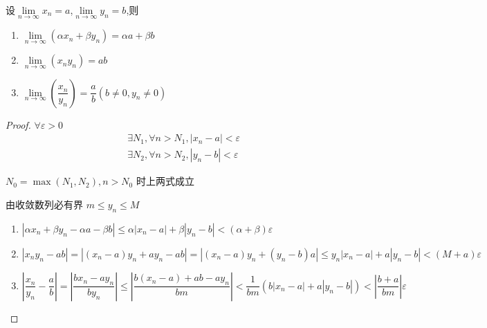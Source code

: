 \begin{theorem}
	设$\lim\limits_{n \rightarrow \infty}x_n=a$,$\lim\limits_{n \rightarrow \infty}y_n=b$,则
	\begin{enumerate}
		\item$\lim\limits_{n \rightarrow \infty}\left(\alpha x_n+\beta y_n\right)=\alpha a+\beta b$
		\item$\lim\limits_{n \rightarrow \infty}\left(x_n y_n\right)=a b$
		\item$\lim\limits_{n \rightarrow \infty}\left(\dfrac{x_n}{y_n}\right)=\dfrac{a}{b}(b \neq 0,y_n\neq0)$
	\end{enumerate}
\end{theorem}
\begin{proof}
	$\forall \varepsilon>0 $
	\begin{align*}
		&\exists N_1 ,\forall n>N_1 ,\left|x_n-a\right|<\varepsilon	\\
		&\exists N_2 ,\forall n>N_2 ,\left|y_n-b\right|<\varepsilon
	\end{align*}
	
	
	$N_0=\max \left(N_1, N_2\right) , n>N_0$ 时上两式成立 
	
	由收敛数列必有界 $m \leqslant y_n \leqslant M$
	\begin{enumerate}
		\item$\left|\alpha x_n+\beta y_n-\alpha a-\beta b\right| \leqslant \alpha\left|x_n-a\right|+\beta\left|y_n-b\right|<(\alpha+\beta) \varepsilon$
		\item
		$\left|x_n y_n-a b\right|=\left|\left(x_n-a\right) y_n+a y_n-a b\right|=\left|(x_n-a)y_n+(y_n-b)a\right|\leqslant y_n\left|x_n-a\right|+a\left|y_n-b\right|<(M+a) \varepsilon$
		\item$\left|\dfrac{x_n}{y_n}-\dfrac{a}{b}\right|=\left|\dfrac{b x_n-a y_n}{b y_n}\right| \leqslant\left|\dfrac{b\left(x_n-a\right)+a b-a y_n}{b m}\right|<\dfrac{1}{b m }\left(b\left|x_n-a\right|+a\left|y_n-b\right|\right)<\left|\dfrac{b+a}{b m}\right| \varepsilon$
	\end{enumerate}
\end{proof}

